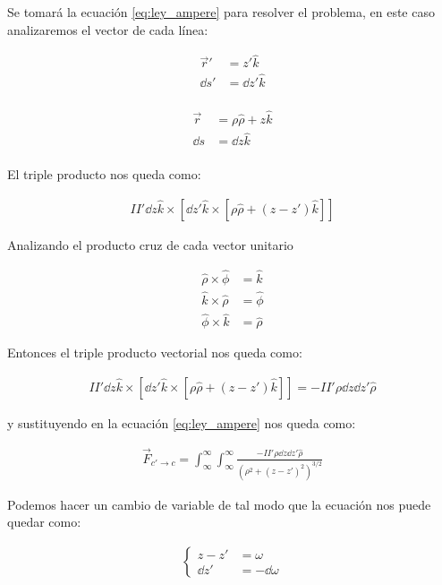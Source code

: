 \documentclass[11pt]{report}
\theoremstyle{plain}
\theoremstyle{definition}
\begin{document}
Se tomará la ecuación \ref{eq:ley_ampere} para resolver el problema, en este caso analizaremos el vector de cada línea:

\begin{align*}
	\vec{r}' &= z' \hat{k}\\
	\dd{s}' &= \dd{z}'\hat{k}\\
\end{align*}

\begin{align*}
	\vec{r} &= \rho \hat{\rho} + z \hat{k}\\
	\dd{s} &= \dd{z}\hat{k}\\
\end{align*}

El triple producto nos queda como:

\begin{align*}
	II' \dd{z}\hat{k} \times [\dd{z'}\hat{k} \times [\rho \hat{\rho} + (z-z')\hat{k}]]
\end{align*}


Analizando el producto cruz de cada vector unitario

\begin{align*}
	\hat{\rho} \times \hat{\phi} &= \hat{k}\\
	\hat{k} \times \hat{\rho} &= \hat{\phi} \\
	\hat{\phi} \times \hat{k} &= \hat{\rho} 
\end{align*}


Entonces el triple producto vectorial nos queda como:

\begin{align*}
	II' \dd{z}\hat{k} \times [\dd{z'}\hat{k} \times [\rho \hat{\rho} + (z-z')\hat{k}]] = -II'\rho\dd{z}\dd{z'}\hat{\rho}
\end{align*}

y sustituyendo en la ecuación \ref{eq:ley_ampere} nos queda como:

\begin{align*}
	\vec{F}_{c'\rightarrow c} = \int_\infty^\infty \int_\infty^\infty \frac{ -II'\rho\dd{z}\dd{z'}\hat{\rho}}{(\rho^2 + (z-z')^2)^{3/2}}
\end{align*}


Podemos hacer un cambio de variable de tal modo que la ecuación nos puede quedar como:

\begin{align*}
	\begin{cases}
		z - z' &= \omega \\
		\dd{z'} &= -\dd{\omega}
	\end{cases}
\end{align*}
\end{document}
